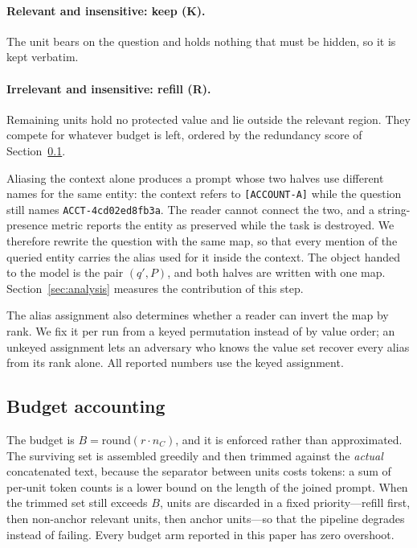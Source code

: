 \paragraph{Relevant and insensitive: keep (\textbf{K}).}
The unit bears on the question and holds nothing that must be hidden, so it is kept verbatim.

\paragraph{Irrelevant and insensitive: refill (\textbf{R}).}
Remaining units hold no protected value and lie outside the relevant region. They compete
for whatever budget is left, ordered by the redundancy score of
Section~\ref{sec:method-budget}.


Aliasing the context alone produces a prompt whose two halves use different names for the
same entity: the context refers to \texttt{[ACCOUNT-A]} while the question still names
\texttt{ACCT-4cd02ed8fb3a}. The reader cannot connect the two, and a string-presence metric
reports the entity as preserved while the task is destroyed. We therefore rewrite the
question with the same map, so that every mention of the queried entity carries the alias
used for it inside the context. The object handed to the model is the pair $(q',P)$, and both
halves are written with one map. Section~\ref{sec:analysis} measures the contribution of
this step.

The alias assignment also determines whether a reader can invert the map by rank. We fix it
per run from a keyed permutation instead of by value order; an unkeyed assignment lets an
adversary who knows the value set recover every alias from its rank alone. All reported
numbers use the keyed assignment.

\subsection{Budget accounting}
\label{sec:method-budget}

The budget is $B=\mathrm{round}(r\cdot n_C)$, and it is enforced rather than approximated. The
surviving set is assembled greedily and then trimmed against the \emph{actual} concatenated
text, because the separator between units costs tokens: a sum of per-unit token counts is a
lower bound on the length of the joined prompt. When the trimmed set still exceeds $B$,
units are discarded in a fixed priority---refill first, then non-anchor relevant units, then
anchor units---so that the pipeline degrades instead of failing. Every budget arm reported in
this paper has zero overshoot.


